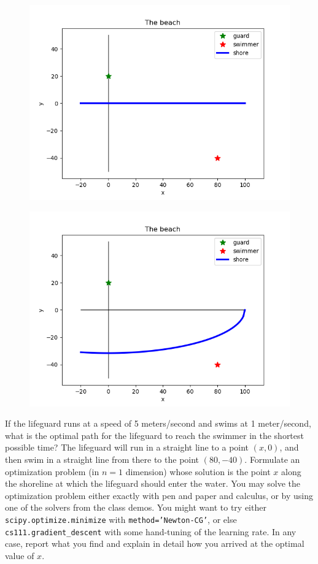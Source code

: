 \documentclass[11pt]{article}
\begin{document}
\begin{figure}[t]
\centering
\begin{minipage}{.5\textwidth}
  \centering
  \includegraphics[width=.65\linewidth]{StraightBeach}
  \label{fig:geometric}
\end{minipage}%
\begin{minipage}{.5\textwidth}
  \centering
  \includegraphics[width=.65\linewidth]{CurvedBeach}
  \label{fig:spectral}
\end{minipage}
\end{figure}

If the lifeguard runs at a speed of 5 meters/second and swims 
at 1 meter/second, what is the optimal path for the lifeguard
to reach the swimmer in the shortest possible time? 
The lifeguard will run in a straight line to a point $(x,0)$, 
and then swim in a straight line from there to the point $(80,-40)$.
Formulate an optimization problem (in $n=1$ dimension) whose solution is
the point $x$ along the shoreline at which the lifeguard should
enter the water. You may solve the optimization problem either
exactly with pen and paper and calculus, 
or by using one of the solvers from the class demos. 
You might want to try either {\tt scipy.optimize.minimize}
with {\tt method='Newton-CG'}, or else {\tt cs111.gradient\_descent}
with some hand-tuning of the learning rate.
In any case, report what you find and explain in detail
how you arrived at the optimal value of $x$.
\end{document}
